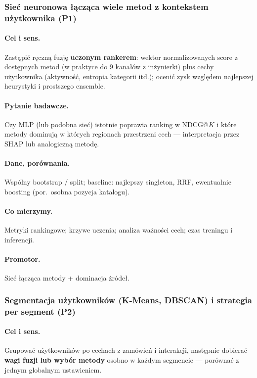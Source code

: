 \documentclass[a4paper,11pt]{article}
\begin{document}
\subsubsection{Sieć neuronowa łącząca wiele metod z kontekstem użytkownika (\textbf{P1})}

\paragraph{Cel i sens.}
Zastąpić ręczną fuzję \textbf{uczonym rankerem}: wektor normalizowanych score z dostępnych metod (w praktyce do 9 kanałów z inżynierki) plus cechy użytkownika (aktywność, entropia kategorii itd.); ocenić zysk względem najlepszej heurystyki i prostszego ensemble.

\paragraph{Pytanie badawcze.}
Czy MLP (lub podobna sieć) istotnie poprawia ranking w NDCG@$K$ i które metody dominują w których regionach przestrzeni cech --- interpretacja przez SHAP lub analogiczną metodę.

\paragraph{Dane, porównania.}
Wspólny bootstrap / split; baseline: najlepszy singleton, RRF, ewentualnie boosting (por.\ osobna pozycja katalogu).

\paragraph{Co mierzymy.}
Metryki rankingowe; krzywe uczenia; analiza ważności cech; czas treningu i inferencji.

\paragraph{Promotor.}
Sieć łącząca metody + dominacja źródeł.

\subsubsection{Segmentacja użytkowników (K-Means, DBSCAN) i strategia per segment (\textbf{P2})}

\paragraph{Cel i sens.}
Grupować użytkowników po cechach z zamówień i interakcji, następnie dobierać \textbf{wagi fuzji lub wybór metody} osobno w każdym segmencie --- porównać z jednym globalnym ustawieniem.
\end{document}
